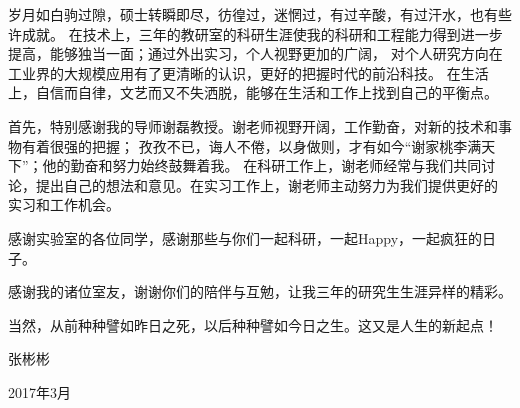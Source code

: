 

\vspace{2ex}
岁月如白驹过隙，硕士转瞬即尽，彷徨过，迷惘过，有过辛酸，有过汗水，也有些许成就。
在技术上，三年的教研室的科研生涯使我的科研和工程能力得到进一步提高，能够独当一面；通过外出实习，个人视野更加的广阔，
对个人研究方向在工业界的大规模应用有了更清晰的认识，更好的把握时代的前沿科技。
在生活上，自信而自律，文艺而又不失洒脱，能够在生活和工作上找到自己的平衡点。


首先，特别感谢我的导师谢磊教授。谢老师视野开阔，工作勤奋，对新的技术和事物有着很强的把握；
孜孜不已，诲人不倦，以身做则，才有如今“谢家桃李满天下”；他的勤奋和努力始终鼓舞着我。
在科研工作上，谢老师经常与我们共同讨论，提出自己的想法和意见。在实习工作上，谢老师主动努力为我们提供更好的
实习和工作机会。

感谢实验室的各位同学，感谢那些与你们一起科研，一起Happy，一起疯狂的日子。

感谢我的诸位室友，谢谢你们的陪伴与互勉，让我三年的研究生生涯异样的精彩。

当然，从前种种譬如昨日之死，以后种种譬如今日之生。这又是人生的新起点！

\vspace{24pt}

\quad\quad\quad\quad\quad\quad\quad\quad\quad\quad\quad\quad\quad\quad\quad\quad\quad\quad\quad\quad\quad\quad\quad\quad\quad\quad\quad\quad\quad\quad 张彬彬

\quad\quad\quad\quad\quad\quad\quad\quad\quad\quad\quad\quad\quad\quad\quad\quad\quad\quad\quad\quad\quad\quad\quad\quad\quad\quad\quad\quad\quad 2017年3月




\clearpage\mbox{}
